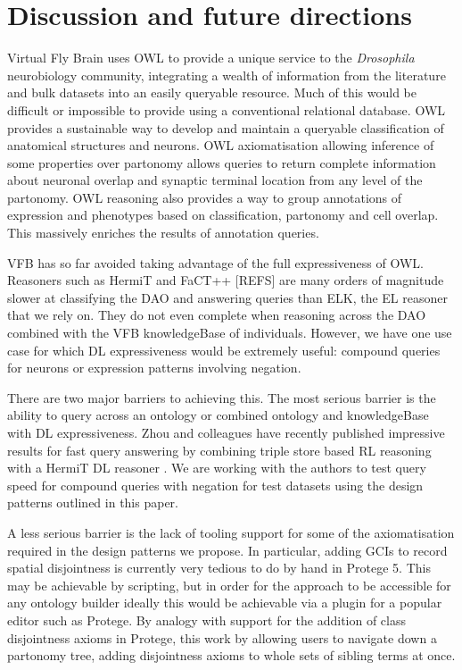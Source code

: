 \documentclass[runningheads,a4paper]{llncs}
\begin{document}
\section{Discussion and future directions}


Virtual Fly Brain uses OWL to provide a unique service to the
\textit{Drosophila} neurobiology community, integrating a wealth of
information from the literature and bulk datasets into an easily
queryable resource.  Much of this would be difficult or impossible to
provide using a conventional relational database. OWL
provides a sustainable way to develop and maintain a queryable
classification of anatomical structures and neurons.  OWL
axiomatisation allowing inference of some properties over partonomy
allows queries to return complete information about neuronal
overlap and synaptic terminal location from any level of the
partonomy.  OWL reasoning also provides a way to group annotations of
expression and phenotypes based on classification, partonomy and cell
overlap.  This massively enriches the results of annotation queries.

VFB has so far avoided taking advantage of the full expressiveness of
OWL.  Reasoners such as HermiT and FaCT++ [REFS] are many orders of
magnitude slower at classifying the DAO and answering queries than
ELK, the EL reasoner that we rely on.  They do not even complete when
reasoning across the DAO combined with the VFB knowledgeBase of
individuals.  However, we have one use case for which DL
expressiveness would be extremely useful: compound queries for neurons
or expression patterns involving negation.

There are two major barriers to achieving this. The most serious
barrier is the ability to query across an ontology or combined ontology and
knowledgeBase with DL expressiveness.  Zhou and colleagues have
recently published impressive results for fast query answering by
combining triple store based RL reasoning with a HermiT DL reasoner
\cite{ZNCH14a}.  We are working with the authors to test query speed
for compound queries with negation for test datasets using the design
patterns outlined in this paper.

A less serious barrier is the lack of tooling support for some of the
axiomatisation required in the design patterns we propose.  In
particular, adding GCIs to record spatial disjointness is currently
very tedious to do by hand in Protege 5.  This may be achievable by
scripting, but in order for the approach to be accessible for any
ontology builder ideally this would be achievable via a plugin for a
popular editor such as Protege.  By analogy with support for the
addition of class disjointness axioms in Protege, this work by allowing
users to navigate down a partonomy tree, adding disjointness axioms to
whole sets of sibling terms at once.
\end{document}
